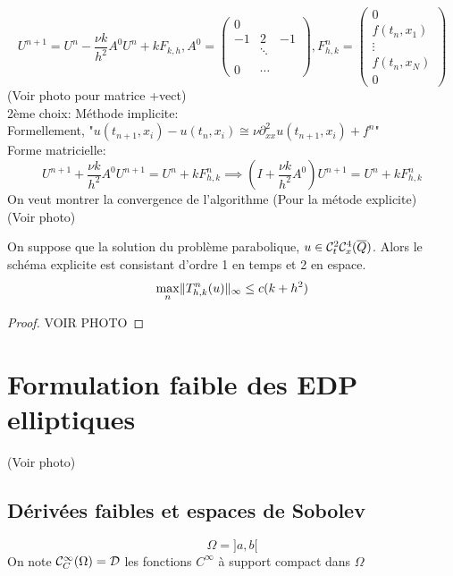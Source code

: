 \documentclass[]{report}
\begin{document}
    \[U^{n+1}=U^n-\frac{\nu k}{h^2}A^0 U^n+kF_{k,h},A^0=\left(\begin{matrix}
        0&&\\
        -1&2&-1\\
        &\ddots&\\
        &&\\
        0&\cdots&
    \end{matrix}\right),F_{h,k}^n=\left(\begin{matrix}
        0\\
        f(t_n,x_1)\\
        \vdots\\
        f(t_n,x_{N})\\
        0
    \end{matrix}\right)\]
    (Voir photo pour matrice +vect)\\
    2ème choix: Méthode implicite:\\
    Formellement, "$u(t_{n+1},x_i)-u(t_n,x_i)\cong \nu \partial_{xx}^2u(t_{n+1},x_i)+f^n$"\\
    Forme matricielle:
    \[U^{n+1}+\frac{\nu k}{h^2}A^0 U^{n+1}=U^n+kF_{h,k}^n\implies \left(I+\frac{\nu k}{h^2}A^0 \right)U^{n+1}=U^n+kF_{h,k}^n\]
    On veut montrer la convergence de l'algorithme (Pour la métode explicite)\\
    (Voir photo)\\
    
    \begin{tm}{}{}
        On suppose que la solution du problème parabolique, $u\in \mathcal{C}^2_t\mathcal{C}^4_x(\overline{Q})$. Alors le schéma explicite est consistant d'ordre 1 en temps et 2 en espace.
        \[\max_n\lVert T_{h,k}^n(u) \rVert_{\infty}\le c(k+h^2)\]
    \end{tm}

    \begin{proof}
        VOIR PHOTO
    \end{proof}

    \chapter{Formulation faible des EDP elliptiques}

    (Voir photo)

    \section{Dérivées faibles et espaces de Sobolev}
    \[\Omega=]a,b[\]
    On note $\mathcal{C}_C^\infty(\Omega)=\mathcal{D}$ les fonctions $C^\infty$ à support compact dans $\Omega$
\end{document}
